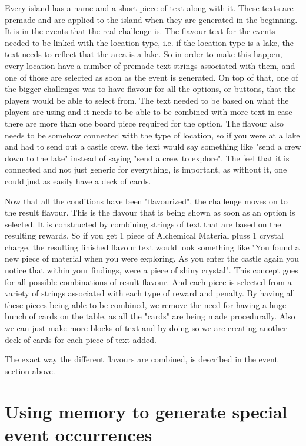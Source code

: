 \documentclass[a4paper,11pt]{report}
\begin{document}
Every island has a name and a short piece of text along with it. These texts are premade and are applied to the island when they are generated in the beginning. 
It is in the events that the real challenge is. The flavour text for the events needed to be linked with the location type, i.e. if the location type is a lake, the text needs to reflect that the area is a lake. So in order to make this happen, every location have a number of premade text strings associated with them, and one of those are selected as soon as the event is generated. On top of that, one of the bigger challenges was to have flavour for all the options, or buttons, that the players would be able to select from. The text needed to be based on what the players are using and it needs to be able to be combined with more text in case there are more than one board piece required for the option. The flavour also needs to be somehow connected with the type of location, so if you were at a lake and had to send out a castle crew, the text would say something like "send a crew down to the lake" instead of saying "send a crew to explore". The feel that it is connected and not just generic for everything, is important, as without it, one could just as easily have a deck of cards. 

Now that all the conditions have been "flavourized", the challenge moves on to the result flavour. This is the flavour that is being shown as soon as an option is selected. It is constructed by combining strings of text that are based on the resulting rewards. So if you get 1 piece of Alchemical Material pluss 1 crystal charge, the resulting finished flavour text would look something like "You found a new piece of material when you were exploring. As you enter the castle again you notice that within your findings, were a piece of shiny crystal". 
This concept goes for all possible combinations of result flavour. And each piece is selected from a variety of strings associated with each type of reward and penalty. By having all these pieces being able to be combined, we remove the need for having a huge bunch of cards on the table, as all the "cards" are being made procedurally. Also we can just make more blocks of text and by doing so we are creating another deck of cards for each piece of text added.

The exact way the different flavours are combined, is described in the event section above.

\section{Using memory to generate special event occurrences}
\end{document}
